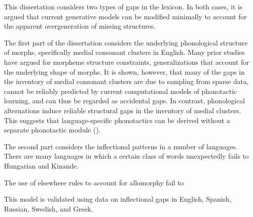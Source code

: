 This dissertation considers two types of gaps in the lexicon. In both cases, it is argued that current generative models can be modified minimally to account for the apparent overgeneration of missing structures. 

The first part of the dissertation considers the underlying phonological structure of morphs, specifically medial consonant clusters in English. Many prior studies have argued for morpheme structure constraints, generalizations that account for the underlying shape of morphs. It is shown, however, that many of the gaps in the inventory of medial consonant clusters are due to sampling from sparse data, cannot be reliably predicted by current computational models of phonotactic learning, and can thus be regarded as accidental gaps. In contrast, phonological alternations induce reliable structural gaps in the inventory of medial clusters. This suggests that language-specific phonotactics can be derived without a separate phonotactic module (\citealt{Halle1962}). 

The second part considers the inflectional patterns in a number of languages. There are many languages in which a certain class of words unexpectedly fails to 
Hungarian and Kinande. 

The use of elsewhere rules to account for allomorphy fail to 

This model is validated using data on inflectional gaps in English, Spanish, Russian, Swedish, and Greek.

